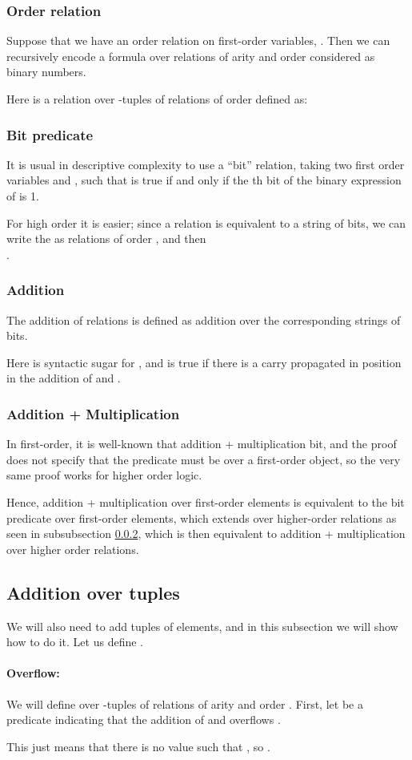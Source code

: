 \documentclass[a4paper,12pt]{article}
\newcommand{\sss}[1]{\subsubsection{#1}}
\theoremstyle{definition}
\begin{document}
\sss{Order relation}\label{order}
Suppose that we have an order relation on first-order variables,
. Then we can recursively encode a formula
 over relations of arity
 and order  considered as binary numbers.



Here  is a relation over -tuples of relations of order 
defined as: 


\sss{Bit predicate}\label{bit}
It is usual in descriptive complexity to use a ``bit'' relation,
taking two first order variables  and , such that  is
true if and only if the th bit of the binary expression of  is
1.


For high order it is easier; since a relation  is equivalent
to a string of  bits, we can write the  as  relations
of order , and then
\\.

\sss{Addition}

The addition of relations is defined as addition over the
corresponding strings of bits.

 

Here  is syntactic sugar for , and
 is
true if there is a carry propagated in position  in the
addition of  and .



\sss{Addition + Multiplication}
In first-order, it is well-known that addition + multiplication
 bit, and the proof does not specify that the predicate must
be over a first-order object, so the very same proof works for higher
order logic.

Hence, addition + multiplication over first-order elements is
equivalent to the bit predicate over first-order elements, which
extends over higher-order relations as seen in subsubsection
\ref{bit}, which is then equivalent to addition + multiplication over
higher order relations.

\subsection{Addition over tuples}
We will also need to add tuples of elements, and in this subsection we
will show how to do it. Let us define .
\paragraph{Overflow:}
We will define  over -tuples of relations of arity 
and order . First, let  be a
predicate indicating that the addition of  and 
overflows .

This just means that there is no value  such that ,
so .
\end{document}
